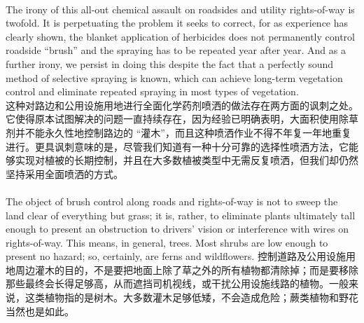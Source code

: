 \documentclass{article}
\begin{document}
\\
The irony of this all-out chemical assault on roadsides and utility rights-of-way is twofold. It is perpetuating the problem it seeks to correct, for as experience has clearly shown, the blanket application of herbicides does not permanently control roadside “brush” and the spraying has to be repeated year after year. And as a further irony, we persist in doing this despite the fact that a perfectly sound method of selective spraying is known, which can achieve long-term vegetation control and eliminate repeated spraying in most types of vegetation.\\
这种对路边和公用设施用地进行全面化学药剂喷洒的做法存在两方面的讽刺之处。它使得原本试图解决的问题一直持续存在，因为经验已明确表明，大面积使用除草剂并不能永久性地控制路边的 “灌木”，而且这种喷洒作业不得不年复一年地重复进行。更具讽刺意味的是，尽管我们知道有一种十分可靠的选择性喷洒方法，它能够实现对植被的长期控制，并且在大多数植被类型中无需反复喷洒，但我们却仍然坚持采用全面喷洒的方式。\\  

\\
The object of brush control along roads and rights-of-way is not to sweep the land clear of everything but grass; it is, rather, to eliminate plants ultimately tall enough to present an obstruction to drivers’ vision or interference with wires on rights-of-way. This means, in general, trees. Most shrubs are low enough to present no hazard; so, certainly, are ferns and wildflowers.
控制道路及公用设施用地周边灌木的目的，不是要把地面上除了草之外的所有植物都清除掉；而是要移除那些最终会长得足够高，从而遮挡司机视线，或干扰公用设施线路的植物。一般来说，这类植物指的是树木。大多数灌木足够低矮，不会造成危险；蕨类植物和野花当然也是如此。\\
\end{document}
